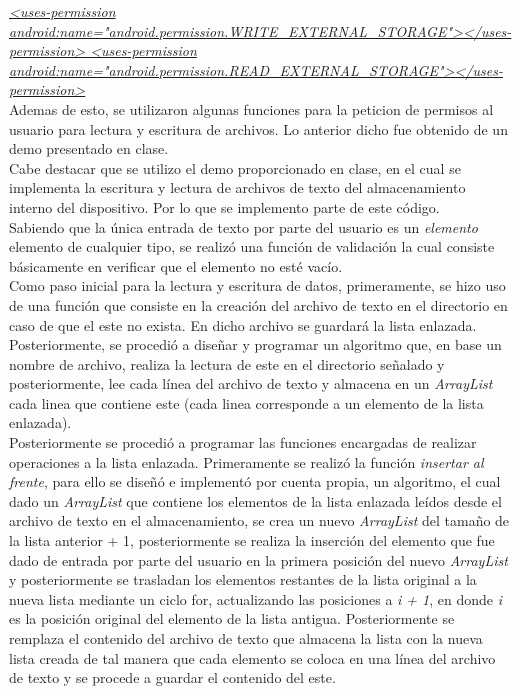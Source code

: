 \documentclass[conference]{IEEEtran}
\begin{document}
\textit{ \url{<uses-permission android:name="android.permission.WRITE_EXTERNAL_STORAGE"></uses-permission>
    <uses-permission android:name="android.permission.READ_EXTERNAL_STORAGE"></uses-permission>}}\\

Ademas de esto, se utilizaron algunas funciones para la peticion de permisos al usuario para lectura y escritura de archivos. Lo anterior dicho fue obtenido de un demo presentado en clase.\\

Cabe destacar que se utilizo el demo proporcionado en clase, en el cual se implementa la escritura y lectura de archivos de texto del almacenamiento interno del dispositivo. Por lo que se implemento parte de este código. \\
Sabiendo que la única entrada de texto por parte del usuario es un \textit{elemento} elemento de cualquier tipo, se realizó una función de validación la cual consiste básicamente en verificar que el elemento no esté vacío.\\
Como paso inicial para la lectura y escritura de datos, primeramente, se hizo uso de una función que consiste en la creación del archivo de texto en el directorio en caso de que el este no exista. En dicho archivo se guardará la lista enlazada. Posteriormente, se procedió a diseñar y programar un algoritmo que, en base un nombre de archivo, realiza la lectura de este en el directorio señalado y posteriormente, lee cada línea del archivo de texto y almacena en un \textit{ArrayList} cada linea que contiene este (cada linea corresponde a un elemento de la lista enlazada).\\

Posteriormente se procedió a programar las funciones encargadas de realizar operaciones a la lista enlazada. Primeramente se realizó la función \textit{insertar al frente}, para ello se diseñó e implementó por cuenta propia, un algoritmo, el cual dado un \textit{ArrayList} que contiene los elementos de la lista enlazada leídos desde el archivo de texto en el almacenamiento, se crea un nuevo \textit{ArrayList} del tamaño de la lista anterior + 1, posteriormente se realiza la inserción del elemento que fue dado de entrada por parte del usuario en la primera posición del nuevo \textit{ArrayList} y posteriormente se trasladan los elementos restantes de la lista original a la nueva lista mediante un ciclo for, actualizando las posiciones a \textit{i + 1}, en donde \textit{i} es la posición original del elemento de la lista antigua. Posteriormente se remplaza el contenido del archivo de texto que almacena la lista con la nueva lista creada de tal manera que cada elemento se coloca en una línea del archivo de texto y se procede a guardar el contenido del este.\\
\end{document}
